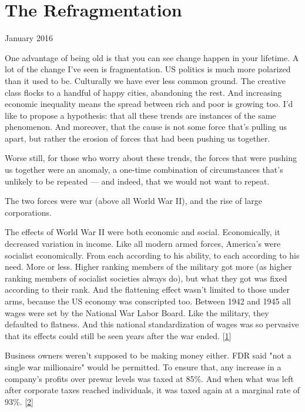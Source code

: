 \chapter{The Refragmentation}



January 2016

One advantage of being old is that you can see change happen in
your lifetime.  A lot of the change I've seen is fragmentation.  US
politics is much more polarized than it used to be.  Culturally we
have ever less common ground. The creative class flocks to a handful
of happy cities, abandoning the rest.  And increasing economic
inequality means the spread between rich and poor is growing too.
I'd like to propose a hypothesis: that all these trends are instances
of the same phenomenon.  And moreover, that the cause is not some
force that's pulling us apart, but rather the erosion of forces
that had been pushing us together.

Worse still, for those who worry about these trends, the forces
that were pushing us together were an anomaly, a one-time combination
of circumstances that's unlikely to be repeated --- and indeed, that
we would not want to repeat.

The two forces were war (above all World War II), and the rise of
large corporations.

The effects of World War II were both economic and social.
Economically, it decreased variation in income.  Like all modern
armed forces, America's were socialist economically.  From each
according to his ability, to each according to his need.  More or
less.  Higher ranking members of the military got more (as higher
ranking members of socialist societies always do), but what they
got was fixed according to their rank.  And the flattening effect
wasn't limited to those under arms, because the US economy was
conscripted too.  Between 1942 and 1945 all wages were set by the
National War Labor Board. Like the military, they defaulted to
flatness.  And this national standardization of wages was so pervasive
that its effects could still be seen years after the war ended.
[\href{\#f1n}{1}]

Business owners weren't supposed to be making money either.  FDR
said "not a single war millionaire" would be permitted.  To ensure
that, any increase in a company's profits over prewar levels was
taxed at 85\%.  And when what was left after corporate taxes reached
individuals, it was taxed again at a marginal rate of 93\%.
[\href{\#f2n}{2}]

